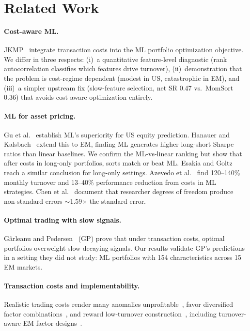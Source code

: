 \documentclass[sigconf,balance=false]{acmart}
\begin{document}
\section{Related Work}

\paragraph{Cost-aware ML.}
JKMP~\cite{jensen2024implementable} integrate transaction costs into
the ML portfolio optimization objective. We differ in three respects:
(i)~a quantitative feature-level diagnostic (rank autocorrelation
classifies which features drive turnover), (ii)~demonstration that the
problem is cost-regime dependent (modest in US, catastrophic in EM),
and (iii)~a simpler upstream fix (slow-feature selection, net SR 0.47
vs.\ MomSort 0.36) that avoids cost-aware optimization entirely.

\paragraph{ML for asset pricing.}
Gu et al.~\cite{gu2020empirical} establish ML's superiority for US
equity prediction. Hanauer and Kalsbach~\cite{hanauer2023machine}
extend this to EM, finding ML generates higher long-short Sharpe ratios
than linear baselines. We confirm the ML-vs-linear ranking but show
that after costs in long-only portfolios, sorts match or beat ML.
Esakia and Goltz~\cite{esakia2025longonly} reach a similar conclusion
for long-only settings. Azevedo et al.~\cite{azevedo2024expected} find
120--140\% monthly turnover and 13--40\% performance reduction from
costs in ML strategies. Chen et al.~\cite{chen2025nonstandard} document
that researcher degrees of freedom produce non-standard errors
$\sim$1.59$\times$ the standard error.

\paragraph{Optimal trading with slow signals.}
G\^{a}rleanu and Pedersen~\cite{garleanu2013dynamic} (GP) prove that
under transaction costs, optimal portfolios overweight slow-decaying
signals. Our results validate GP's predictions in a setting they did
not study: ML portfolios with 154 characteristics across 15 EM
markets.

\paragraph{Transaction costs and implementability.}
Realistic trading costs render many anomalies
unprofitable~\cite{novymarx2016taxonomy}, favor diversified factor
combinations~\cite{demiguel2020transaction}, and reward low-turnover
construction~\cite{frazzini2018trading}, including turnover-aware EM
factor designs~\cite{stankov2024cost}.
\end{document}
